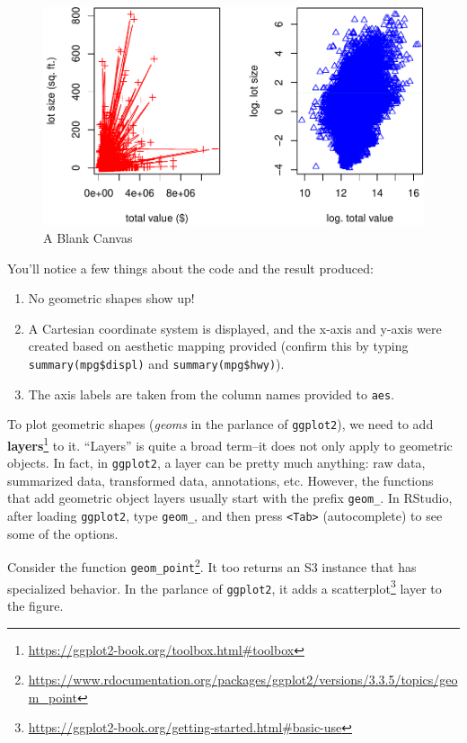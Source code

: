 \documentclass[
  12pt,
]{krantz}
\renewcommand{\href}[2]{#2\footnote{\url{#1}}}
\begin{document}
\begin{figure}
\includegraphics[width=0.8\linewidth]{r_and_python_book_files/figure-latex/unnamed-chunk-168-1} \caption{A Blank Canvas}\label{fig:unnamed-chunk-168}
\end{figure}

You'll notice a few things about the code and the result produced:

\begin{enumerate}
\def\labelenumi{\arabic{enumi}.}
\item
  No geometric shapes show up!
\item
  A Cartesian coordinate system is displayed, and the x-axis and y-axis were created based on aesthetic mapping provided (confirm this by typing \texttt{summary(mpg\$displ)} and \texttt{summary(mpg\$hwy)}).
\item
  The axis labels are taken from the column names provided to \texttt{aes}.
\end{enumerate}

To plot geometric shapes (\emph{geoms} in the parlance of \texttt{ggplot2}), we need to add \href{https://ggplot2-book.org/toolbox.html\#toolbox}{\textbf{layers}} to it. ``Layers'' is quite a broad term--it does not only apply to geometric objects. In fact, in \texttt{ggplot2}, a layer can be pretty much anything: raw data, summarized data, transformed data, annotations, etc. However, the functions that add geometric object layers usually start with the prefix \texttt{geom\_}. In RStudio, after loading \texttt{ggplot2}, type \texttt{geom\_}, and then press \texttt{\textless{}Tab\textgreater{}} (autocomplete) to see some of the options.

Consider the function \href{https://www.rdocumentation.org/packages/ggplot2/versions/3.3.5/topics/geom_point}{\texttt{geom\_point}}. It too returns an S3 instance that has specialized behavior. In the parlance of \texttt{ggplot2}, it adds a \href{https://ggplot2-book.org/getting-started.html\#basic-use}{scatterplot} layer to the figure.
\end{document}
